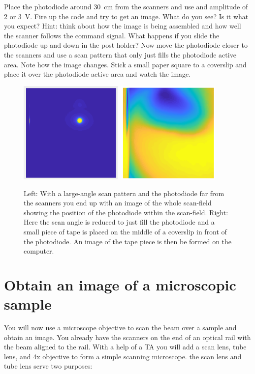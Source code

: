 \documentclass[a4paper]{report}
\begin{document}
\noindent
Place the photodiode around 30~cm from the scanners and use and amplitude of 2 or 3~V.
Fire up the code and try to get an image. 
What do you see?
Is it what you expect? Hint: think about how the image is being assembled and how well the scanner follows the command signal.
What happens if you slide the photodiode up and down in the post holder?
Now move the photodiode closer to the scanners and use a scan pattern that only just fills the photodiode active area. 
Note how the image changes. 
Stick a small paper square to a coverslip and place it over the photodiode active area and watch the image.


\begin{figure}[h]
\centering
\includegraphics[width=2in]{distantPhotoDiode.png}
\includegraphics[width=2in]{PhotoDiode_2Dimage.png}
\caption{Left: With a large-angle scan pattern and the photodiode far from the scanners you end up with an image of the whole scan-field showing the position of the photodiode within the scan-field.
         Right: Here the scan angle is reduced to just fill the photodiode and a small piece of tape is placed on the middle of a coverslip in front of the photodiode. 
         An image of the tape piece is then be formed on the computer.}
\label{PDimage}
\end{figure}



\clearpage


\section{Obtain an image of a microscopic sample}
You will now use a microscope objective to scan the beam over a sample and obtain an image. 
You already have the scanners on the end of an optical rail with the beam aligned to the rail. 
With a help of a TA you will add a scan lens, tube lens, and 4x objective to form a simple scanning microscope. 
the scan lens and tube lens serve two purposes:
\end{document}
